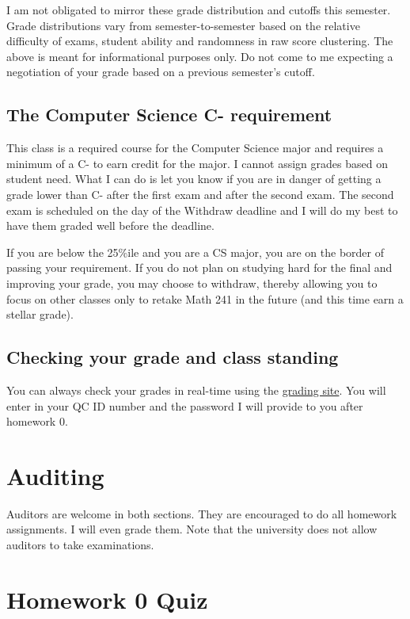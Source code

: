 \documentclass[12pt]{article}
\begin{document}
I am not obligated to mirror these grade distribution and cutoffs this semester. Grade distributions vary from semester-to-semester based on the relative difficulty of exams, student ability and randomness in raw score clustering. The above is meant for informational purposes only. Do not come to me expecting a negotiation of your grade based on a previous semester's cutoff.

\subsection*{The Computer Science C- requirement}

This class is a required course for the Computer Science major and requires a minimum of a C- to earn credit for the major. I cannot assign grades based on student need. What I can do is let you know if you are in danger of getting a grade lower than C- after the first exam and after the second exam. The second exam is scheduled on the day of the Withdraw deadline and I will do my best to have them graded well before the deadline. 

If you are below the 25\%ile and you are a CS major, you are on the border of passing your requirement. If you do not plan on studying hard for the final and improving your grade, you may choose to withdraw, thereby allowing you to focus on other classes only to retake Math 241 in the future (and this time earn a stellar grade).

\subsection*{Checking your grade and class standing}

You can always check your grades in real-time using the \href{http://gradesly.com}{grading site}. You will enter in your QC ID number and the password I will provide to you after homework 0.



\section*{Auditing}

Auditors are welcome in both sections. They are encouraged to do all homework assignments. I will even grade them. Note that the university does not allow auditors to take examinations.

\pagebreak

\section*{Homework 0 Quiz}\label{quiz}
\end{document}
